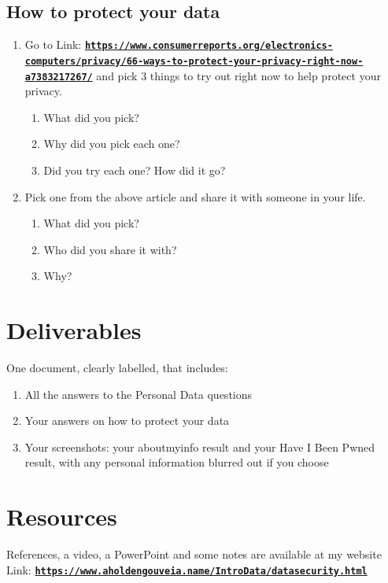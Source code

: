 \documentclass[12pt]{article}
\begin{document}
\subsection*{How to protect your data}
\begin{enumerate}
    \item Go to Link: \href{https://www.consumerreports.org/electronics-computers/privacy/66-ways-to-protect-your-privacy-right-now-a7383217267/}{\textbf{\nolinkurl{https://www.consumerreports.org/electronics-computers/privacy/66-ways-to-protect-your-privacy-right-now-a7383217267/}}} and pick 3 things to try out right now to help protect your privacy.
    \begin{enumerate}
        \item What did you pick?
        \item Why did you pick each one?
        \item Did you try each one? How did it go?
    \end{enumerate}
    \item Pick one from the above article and share it with someone in your life.
    \begin{enumerate}
        \item What did you pick?
        \item Who did you share it with?
        \item Why?
    \end{enumerate}
\end{enumerate}

\section*{Deliverables}
One document, clearly labelled, that includes:
\begin{enumerate}
    \item All the answers to the Personal Data questions
    \item Your answers on how to protect your data
    \item Your screenshots: your aboutmyinfo result and your Have I Been Pwned result, with any personal information blurred out if you choose
\end{enumerate}

\section*{Resources}
References, a video, a PowerPoint and some notes are available at my website
Link: \href{https://www.aholdengouveia.name/IntroData/datasecurity.html}{\textbf{\nolinkurl{https://www.aholdengouveia.name/IntroData/datasecurity.html}}}
\end{document}
